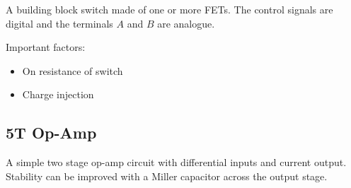 \documentclass[11pt]{article}
\begin{document}
A building block switch made of one or more FETs. The control signals are digital and the terminals $A$ and $B$ are analogue.

\begin{figure}[h]
\end{figure}

Important factors:

\begin{itemize}
  \item On resistance of switch
  \item Charge injection
\end{itemize}


\subsection{5T Op-Amp}

A simple two stage op-amp circuit with differential inputs and current output. Stability can be improved with a Miller capacitor across the output stage.

\begin{figure}[h]
\end{figure}
\end{document}
